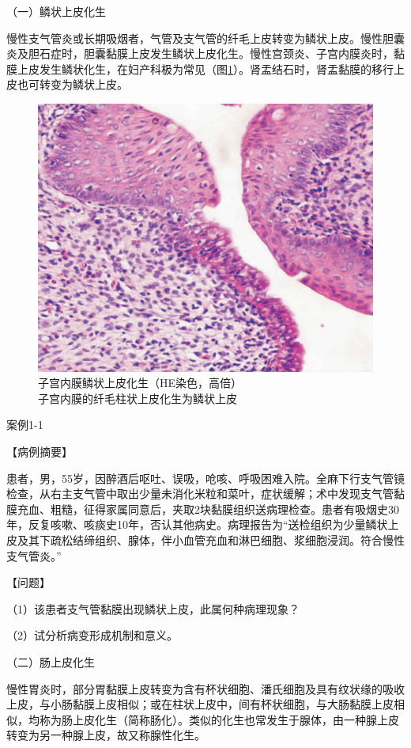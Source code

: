 {（一）鳞状上皮化生}

慢性支气管炎或长期吸烟者，气管及支气管的纤毛上皮转变为鳞状上皮。慢性胆囊炎及胆石症时，胆囊黏膜上皮发生鳞状上皮化生。慢性宫颈炎、子宫内膜炎时，黏膜上皮发生鳞状化生，在妇产科极为常见（图\ref{fig1-2}）。肾盂结石时，肾盂黏膜的移行上皮也可转变为鳞状上皮。
\begin{figure}[!htbp]
	\centering
    \includegraphics{./images/Image00003.jpg}
	\caption{子宫内膜鳞状上皮化生（HE染色，高倍） \\ {\small 子宫内膜的纤毛柱状上皮化生为鳞状上皮}}
	\label{fig1-2} 
	\end{figure} 

\begin{framed}
	{案例1-1}

{【病例摘要】}

患者，男，55岁，因醉酒后呕吐、误吸，呛咳、呼吸困难入院。全麻下行支气管镜检查，从右主支气管中取出少量未消化米粒和菜叶，症状缓解；术中发现支气管黏膜充血、粗糙，征得家属同意后，夹取2块黏膜组织送病理检查。患者有吸烟史30年，反复咳嗽、咳痰史10年，否认其他病史。病理报告为“送检组织为少量鳞状上皮及其下疏松结缔组织、腺体，伴小血管充血和淋巴细胞、浆细胞浸润。符合慢性支气管炎。”

{【问题】}

（1）该患者支气管黏膜出现鳞状上皮，此属何种病理现象？

（2）试分析病变形成机制和意义。
\end{framed}

{（二）肠上皮化生}

慢性胃炎时，部分胃黏膜上皮转变为含有杯状细胞、潘氏细胞及具有纹状缘的吸收上皮，与小肠黏膜上皮相似；或在柱状上皮中，间有杯状细胞，与大肠黏膜上皮相似，均称为肠上皮化生（简称肠化）。类似的化生也常发生于腺体，由一种腺上皮转变为另一种腺上皮，故又称腺性化生。

